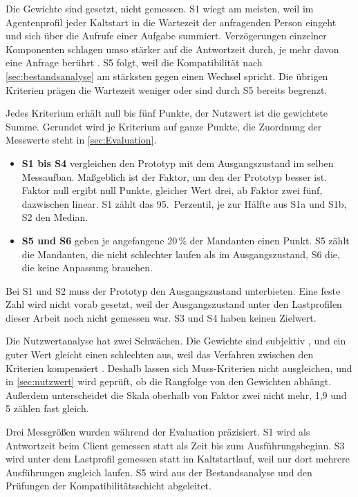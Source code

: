 Die Gewichte sind gesetzt, nicht gemessen. S1 wiegt am meisten, weil im Agentenprofil jeder Kaltstart in die Wartezeit der anfragenden Person eingeht und sich über die Aufrufe einer Aufgabe summiert. Verzögerungen einzelner Komponenten schlagen umso stärker auf die Antwortzeit durch, je mehr davon eine Anfrage berührt \autocite[S.~76]{dean_tail_2013}. S5
folgt, weil die Kompatibilität nach \autoref{sec:bestandsanalyse} am stärksten gegen einen Wechsel spricht. Die übrigen
Kriterien prägen die Wartezeit weniger oder sind durch S5 bereits begrenzt.

Jedes Kriterium erhält null bis fünf Punkte, der Nutzwert ist die gewichtete Summe. Gerundet wird je Kriterium auf ganze
Punkte, die Zuordnung der Messwerte steht in \autoref{sec:Evaluation}.

\begin{itemize}
  \item \textbf{S1 bis S4} vergleichen den Prototyp mit dem Ausgangszustand im selben Messaufbau. Maßgeblich ist der
    Faktor, um den der Prototyp besser ist. Faktor null ergibt null Punkte, gleicher Wert drei, ab Faktor zwei fünf,
    dazwischen linear. S1 zählt das 95.\ Perzentil, je zur Hälfte aus S1a und S1b, S2 den Median.
  \item \textbf{S5 und S6} geben je angefangene 20\,\% der Mandanten einen Punkt. S5 zählt die Mandanten, die nicht
    schlechter laufen als im Ausgangszustand, S6 die, die keine Anpassung brauchen.
\end{itemize}

Bei S1 und S2 muss der Prototyp den Ausgangszustand unterbieten. Eine feste Zahl wird nicht vorab gesetzt, weil der
Ausgangszustand unter den Lastprofilen dieser Arbeit noch nicht gemessen war. S3 und S4 haben keinen Zielwert.

Die Nutzwertanalyse hat zwei Schwächen. Die Gewichte sind subjektiv \autocite[S.~14]{kuehnapfel_scoring_2021}, und ein guter Wert gleicht einen schlechten aus, weil das Verfahren zwischen den Kriterien kompensiert \autocite[S.~272]{kuehnapfel_scoring_2021}. Deshalb lassen sich Muss-Kriterien nicht ausgleichen, und in \autoref{sec:nutzwert}
wird geprüft, ob die Rangfolge von den Gewichten abhängt. Außerdem unterscheidet die Skala oberhalb von Faktor zwei nicht mehr,
1,9 und 5 zählen fast gleich.

Drei Messgrößen wurden während der Evaluation präzisiert. S1 wird als Antwortzeit beim Client gemessen statt als
Zeit bis zum Ausführungsbeginn. S3 wird unter dem Lastprofil gemessen statt im Kaltstartlauf,
weil nur dort mehrere Ausführungen zugleich laufen. S5 wird aus der Bestandsanalyse und den Prüfungen der
Kompatibilitätsschicht abgeleitet.

